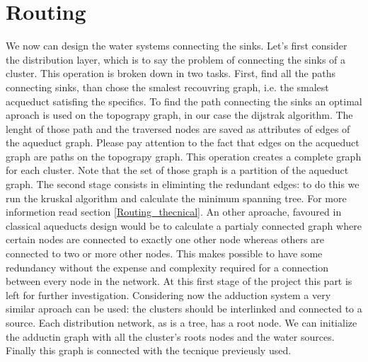 \section{Routing}
We now can design the water systems connecting the sinks. Let’s first consider the distribution layer, 
which is to say the problem of connecting the sinks of a cluster. This operation is broken down in two 
tasks. First, find all the paths connecting sinks, than chose the smalest recouvring graph, i.e. the 
smalest acqueduct satisfing the specifics. \hfill 
To find the path connecting the sinks an optimal aproach is used on the topograpy graph, in our case 
the dijstrak algorithm. The lenght of those path and the traversed nodes are saved as attributes of 
edges of the aqueduct graph. Please pay attention to the fact that edges on the acqueduct graph are 
paths on the topograpy graph. This operation creates a complete graph for each cluster. Note that the 
set of those graph is a partition of the aqueduct graph. \hfill 
The second stage consists in eliminting the redundant edges: to do this we run the kruskal algorithm 
and calculate the minimum spanning tree. For more informetion read section \ref{Routing_thecnical}. 
An other aproache, favoured in classical aqueducts design would be to calculate a partialy connected 
graph where certain nodes are connected to exactly one other node whereas others are connected to two 
or more other nodes. This makes possible to have some redundancy without the expense and complexity 
required for a connection between every node in the network. At this first stage of the project this 
part is left for further investigation.
Considering now the adduction system a very similar aproach can be used: the clusters should be 
interlinked and connected to a source. Each distribution network, as is a tree, has a root node. 
We can initialize the adductin graph with all the cluster's roots nodes and the water sources. 
Finally this graph is connected with the tecnique previeusly used.

